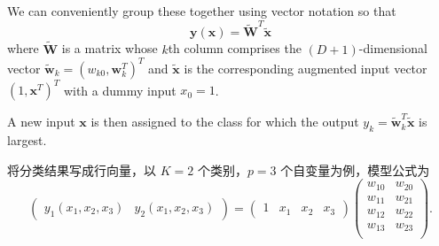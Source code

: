 \documentclass{article}
\begin{document}
We can conveniently group these together using vector notation so that
\begin{equation}
\mathbf{y}(\mathbf{x}) = \widetilde{\mathbf{W}}^T \widetilde{\mathbf{x}}
\tag{5.13}
\end{equation}
where $\widetilde{\mathbf{W}}$ is a matrix whose $k$th column comprises the $(D+1)$-dimensional vector $\widetilde{\mathbf{w}}_k = (w_{k0}, \mathbf{w}_k^T)^T$ and $\widetilde{\mathbf{x}}$ is the corresponding augmented input vector $(1, \mathbf{x}^T)^T$ with a dummy input $x_0 = 1$. 

A new input $\mathbf{x}$ is then assigned to the class for which the output $y_k = \widetilde{\mathbf{w}}_k^T \widetilde{\mathbf{x}}$ is largest.

{\color{red}
将分类结果写成行向量，以 $K=2$ 个类别，$p=3$ 个自变量为例，模型公式为
$$
\begin{pmatrix}y_1(x_1,x_2,x_3) & y_2(x_1,x_2,x_3) \end{pmatrix}
=
\begin{pmatrix}1 & x_1 & x_2 & x_3 \end{pmatrix}
\begin{pmatrix} 
w_{10} & w_{20} \\ 
w_{11} & w_{21} \\ 
w_{12} & w_{22} \\ 
w_{13} & w_{23} \\ 
\end{pmatrix}.
$$

}
\end{document}
